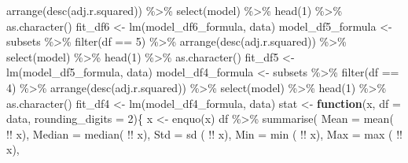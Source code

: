 \documentclass[
  english,
  man,floatsintext]{apa6}
\newenvironment{Shaded}{\begin{snugshade}}{\end{snugshade}}
\newcommand{\AttributeTok}[1]{\textcolor[rgb]{0.77,0.63,0.00}{#1}}
\newcommand{\ControlFlowTok}[1]{\textcolor[rgb]{0.13,0.29,0.53}{\textbf{#1}}}
\newcommand{\DecValTok}[1]{\textcolor[rgb]{0.00,0.00,0.81}{#1}}
\newcommand{\FunctionTok}[1]{\textcolor[rgb]{0.00,0.00,0.00}{#1}}
\newcommand{\NormalTok}[1]{#1}
\newcommand{\OtherTok}[1]{\textcolor[rgb]{0.56,0.35,0.01}{#1}}
\newcommand{\SpecialCharTok}[1]{\textcolor[rgb]{0.00,0.00,0.00}{#1}}
\begin{document}
\begin{Shaded}
\begin{Highlighting}[]
  \FunctionTok{arrange}\NormalTok{(}\FunctionTok{desc}\NormalTok{(adj.r.squared)) }\SpecialCharTok{\%\textgreater{}\%} 
  \FunctionTok{select}\NormalTok{(model) }\SpecialCharTok{\%\textgreater{}\%} \FunctionTok{head}\NormalTok{(}\DecValTok{1}\NormalTok{) }\SpecialCharTok{\%\textgreater{}\%} \FunctionTok{as.character}\NormalTok{() }
\NormalTok{fit\_df6 }\OtherTok{\textless{}{-}} \FunctionTok{lm}\NormalTok{(model\_df6\_formula, data)}
\NormalTok{model\_df5\_formula }\OtherTok{\textless{}{-}}\NormalTok{ subsets }\SpecialCharTok{\%\textgreater{}\%} \FunctionTok{filter}\NormalTok{(df }\SpecialCharTok{==} \DecValTok{5}\NormalTok{) }\SpecialCharTok{\%\textgreater{}\%} 
  \FunctionTok{arrange}\NormalTok{(}\FunctionTok{desc}\NormalTok{(adj.r.squared)) }\SpecialCharTok{\%\textgreater{}\%} 
  \FunctionTok{select}\NormalTok{(model) }\SpecialCharTok{\%\textgreater{}\%} \FunctionTok{head}\NormalTok{(}\DecValTok{1}\NormalTok{) }\SpecialCharTok{\%\textgreater{}\%} \FunctionTok{as.character}\NormalTok{()}
\NormalTok{fit\_df5 }\OtherTok{\textless{}{-}} \FunctionTok{lm}\NormalTok{(model\_df5\_formula, data)}
\NormalTok{model\_df4\_formula }\OtherTok{\textless{}{-}}\NormalTok{ subsets }\SpecialCharTok{\%\textgreater{}\%} \FunctionTok{filter}\NormalTok{(df }\SpecialCharTok{==} \DecValTok{4}\NormalTok{) }\SpecialCharTok{\%\textgreater{}\%} 
  \FunctionTok{arrange}\NormalTok{(}\FunctionTok{desc}\NormalTok{(adj.r.squared)) }\SpecialCharTok{\%\textgreater{}\%} 
  \FunctionTok{select}\NormalTok{(model) }\SpecialCharTok{\%\textgreater{}\%} \FunctionTok{head}\NormalTok{(}\DecValTok{1}\NormalTok{) }\SpecialCharTok{\%\textgreater{}\%} \FunctionTok{as.character}\NormalTok{() }
\NormalTok{fit\_df4 }\OtherTok{\textless{}{-}} \FunctionTok{lm}\NormalTok{(model\_df4\_formula, data)}
\NormalTok{stat }\OtherTok{\textless{}{-}} \ControlFlowTok{function}\NormalTok{(x, }\AttributeTok{df =}\NormalTok{ data, }\AttributeTok{rounding\_digits =} \DecValTok{2}\NormalTok{)\{}
\NormalTok{    x }\OtherTok{\textless{}{-}} \FunctionTok{enquo}\NormalTok{(x)}
\NormalTok{    df }\SpecialCharTok{\%\textgreater{}\%}
      \FunctionTok{summarise}\NormalTok{(}
                       \AttributeTok{Mean  =} \FunctionTok{mean}\NormalTok{( }\SpecialCharTok{!!}\NormalTok{ x),}
                     \AttributeTok{Median  =} \FunctionTok{median}\NormalTok{( }\SpecialCharTok{!!}\NormalTok{ x),}
                         \AttributeTok{Std =} \FunctionTok{sd}\NormalTok{  ( }\SpecialCharTok{!!}\NormalTok{ x),}
                         \AttributeTok{Min =} \FunctionTok{min}\NormalTok{ ( }\SpecialCharTok{!!}\NormalTok{ x),}
                         \AttributeTok{Max =} \FunctionTok{max}\NormalTok{ ( }\SpecialCharTok{!!}\NormalTok{ x),}

\end{Highlighting}
\end{Shaded}
\end{document}
